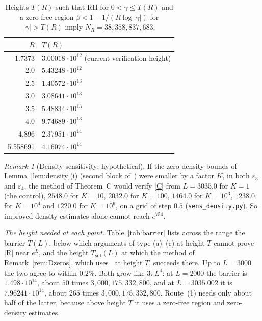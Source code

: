 \documentclass{amsart}
\theoremstyle{definition}
\theoremstyle{remark}
\newtheorem{remark}[theorem]{Remark}
\theoremstyle{plain}
\numberwithin{equation}{section}
\newcommand{\eps}{\varepsilon}
\newcommand{\NN}{38{,}358{,}837{,}683}
\newcommand{\HRH}{3{,}000{,}175{,}332{,}800}
\newcommand{\Tb}{\overline{T}}
\newcommand{\Tsuf}{T_{\mathrm{suf}}}
\begin{document}
\begin{table}[ht]
\caption{Heights $T(R)$ such that RH for $0<\gamma\le T(R)$ and a zero-free region $\beta<1-1/(R\log|\gamma|)$ for $|\gamma|>T(R)$ imply $N_R=\NN$.}\label{tab:tradeoff}
\small
\begin{tabular}{rl}
\toprule
$R$ & $T(R)$\\
\midrule
1.7373   & $3.00018\cdot10^{12}$ (current verification height)\\
2.0      & $5.43248\cdot10^{12}$\\
2.5      & $1.40572\cdot10^{13}$\\
3.0      & $3.08641\cdot10^{13}$\\
3.5      & $5.48834\cdot10^{13}$\\
4.0      & $9.74689\cdot10^{13}$\\
4.896    & $2.37951\cdot10^{14}$\\
5.558691 & $4.16074\cdot10^{14}$\\
\bottomrule
\end{tabular}
\end{table}

\begin{remark}[Density sensitivity; hypothetical]\label{rem:sens}
If the zero-density bounds of Lemma~\ref{lem:density}(i) (second block of~\cite[Table~7]{FKS23}) were smaller by a factor $K$, in both $\eps_3$ and $\eps_4$, the method of Theorem~C would verify \eqref{C} from $L=3035.0$ for $K=1$ (the control), $2548.0$ for $K=10$, $2032.0$ for $K=100$, $1464.0$ for $K=10^3$, $1238.0$ for $K=10^4$ and $1220.0$ for $K=10^6$, on a grid of step $0.5$ (\texttt{sens\_density.py}). So improved density estimates alone cannot reach $e^{754}$.
\end{remark}

\emph{The height needed at each point.} Table~\ref{tab:barrier} lists across the range the barrier $\Tb(L)$, below which arguments of type (a)--(c) at height $T$ cannot prove \eqref{R} near $e^L$, and the height $\Tsuf(L)$ at which the method of Remark~\ref{rem:Dzeros}, which uses~\cite[Prop.~9.1]{CH25} at height $T$, succeeds there. Up to $L=3000$ the two agree to within $0.2\%$. Both grow like $3\pi L^4$: at $L=2000$ the barrier is $1.498\cdot10^{14}$, about $50$ times $\HRH$, and at $L=3035.002$ it is $7.96241\cdot10^{14}$, about $265$ times $\HRH$. Route~(1) needs only about half of the latter, because above height $T$ it uses a zero-free region and zero-density estimates.

\end{document}
